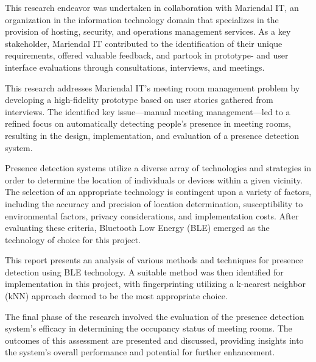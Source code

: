 This research endeavor was undertaken in collaboration with Mariendal IT, an organization in the information technology domain that specializes in the provision of hosting, security, and operations management services\cite{Mariendal_OmOs}.
As a key stakeholder, Mariendal IT contributed to the identification of their unique requirements, offered valuable feedback, and partook in prototype- and user interface evaluations through consultations, interviews, and meetings.

This research addresses Mariendal IT's meeting room management problem by developing a high-fidelity prototype based on user stories gathered from interviews.
The identified key issue—manual meeting management—led to a refined focus on automatically detecting people's presence in meeting rooms, resulting in the design, implementation, and evaluation of a presence detection system.

Presence detection systems utilize a diverse array of technologies and strategies in order to determine the location of individuals or devices within a given vicinity.
The selection of an appropriate technology is contingent upon a variety of factors, including the accuracy and precision of location determination, susceptibility to environmental factors, privacy considerations, and implementation costs.
After evaluating these criteria, Bluetooth Low Energy (BLE) emerged as the technology of choice for this project.

This report presents an analysis of various methods and techniques for presence detection using BLE technology.
A suitable method was then identified for implementation in this project, with fingerprinting utilizing a k-nearest neighbor (kNN) approach deemed to be the most appropriate choice.

The final phase of the research involved the evaluation of the presence detection system's efficacy in determining the occupancy status of meeting rooms.
The outcomes of this assessment are presented and discussed, providing insights into the system's overall performance and potential for further enhancement.
